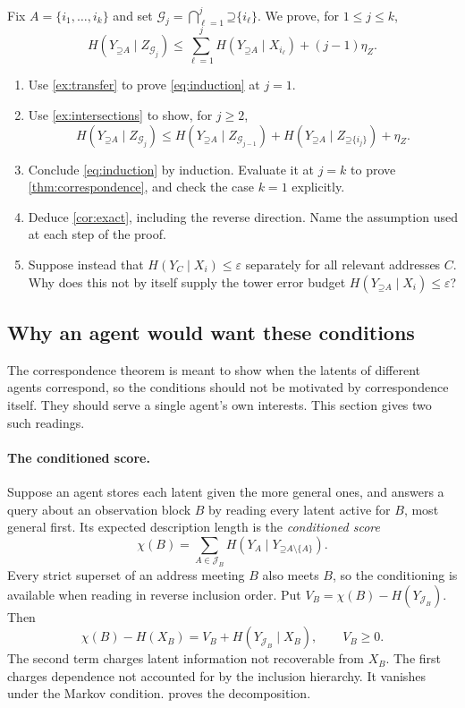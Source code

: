 \documentclass[11pt]{article}
\newcommand{\Up}{\mathord{\supseteq}}
\begin{document}
\begin{exercise}
\label{ex:induction}\important
Fix $A=\{i_1,\ldots,i_k\}$ and set
$\mathcal{G}_j=\bigcap_{\ell=1}^{j}\Up\{i_\ell\}$. We prove, for $1\le j\le k$,
\begin{equation}
 H(Y_{\Up A}\mid Z_{\mathcal{G}_j})\le
 \sum_{\ell=1}^{j}H(Y_{\Up A}\mid X_{i_\ell})+(j-1)\eta_Z.
 \label{eq:induction}
\end{equation}
\begin{enumerate}
\item Use \cref{ex:transfer} to prove \eqref{eq:induction} at $j=1$.
\item Use \cref{ex:intersections} to show, for $j\ge2$,
\[
 H(Y_{\Up A}\mid Z_{\mathcal{G}_j})\le
 H(Y_{\Up A}\mid Z_{\mathcal{G}_{j-1}})+H(Y_{\Up A}\mid Z_{\Up\{i_j\}})+\eta_Z.
\]
\item Conclude \eqref{eq:induction} by induction. Evaluate it at $j=k$ to
prove \cref{thm:correspondence}, and check the case $k=1$ explicitly.
\item Deduce \cref{cor:exact}, including the reverse direction. Name the
assumption used at each step of the proof.
\item Suppose instead that $H(Y_C\mid X_i)\le\varepsilon$ separately for
all relevant addresses $C$. Why does this not by itself supply the tower error
budget $H(Y_{\Up A}\mid X_i)\le\varepsilon$?
\end{enumerate}
\end{exercise}

\subsection{Why an agent would want these conditions}
\label{sec:why}
The correspondence theorem is meant to show when the latents of different
agents correspond, so the conditions should not be motivated by correspondence
itself. They should serve a single agent's own interests. This section gives
two such readings.

\paragraph{The conditioned score.}
Suppose an agent stores each latent given the more general ones, and answers a
query about an observation block $B$ by reading every latent active for $B$,
most general first. Its expected description length is the \emph{conditioned
score}
\[
 \chi(B)=\sum_{A\in\mathcal{J}_B}H(Y_A\mid Y_{\Up A\setminus\{A\}}).
\]
Every strict superset of an address meeting $B$ also meets $B$, so the
conditioning is available when reading in reverse inclusion order. Put
$V_B=\chi(B)-H(Y_{\mathcal{J}_B})$. Then
\begin{equation}
 \chi(B)-H(X_B)=V_B+H(Y_{\mathcal{J}_B}\mid X_B),\qquad V_B\ge0.
 \label{eq:score}
\end{equation}
The second term charges latent information not recoverable from $X_B$.
The first charges dependence not accounted for by the inclusion hierarchy.
It vanishes under the Markov condition.  proves the
decomposition.
\end{document}
